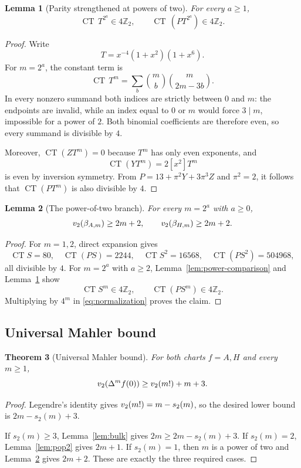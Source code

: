 \documentclass[11pt]{article}
\newtheorem{theorem}{Theorem}
\newtheorem{lemma}[theorem]{Lemma}
\theoremstyle{remark}\newtheorem{remark}[theorem]{Remark}
\newcommand{\CT}{\operatorname{CT}}
\newcommand{\Z}{\mathbb Z}\newcommand{\Q}{\mathbb Q}
\begin{document}
\begin{lemma}[Parity strengthened at powers of two]\label{lem:power-parity}
For every $a\ge1$,
\[
\CT\,T^{2^a}\in4\Z_2,
\qquad
\CT\,(PT^{2^a})\in4\Z_2.
\]
\end{lemma}

\begin{proof}
Write
\[
T=x^{-4}(1+x^2)(1+x^6).
\]
For $m=2^a$, the constant term is
\[
\CT\,T^m=\sum_b\binom mb\binom m{2m-3b}.
\]
In every nonzero summand both indices are strictly between $0$ and $m$:
the endpoints are invalid, while an index equal to $0$ or $m$ would force
$3\mid m$, impossible for a power of $2$.  Both binomial coefficients
are therefore even, so every summand is divisible by $4$.

Moreover, $\CT(ZT^m)=0$ because $T^m$ has only even exponents, and
\[
\CT(YT^m)=2[x^2]T^m
\]
is even by inversion symmetry.  From
$P=13+\pi^2Y+3\pi^3Z$ and $\pi^2=2$, it follows that
$\CT(PT^m)$ is also divisible by $4$.
\end{proof}

\begin{lemma}[The power-of-two branch]\label{lem:powers}
For every $m=2^a$ with $a\ge0$,
\[
v_2(\beta_{A,m})\ge2m+2,
\qquad
v_2(\beta_{H,m})\ge2m+2.
\]
\end{lemma}

\begin{proof}
For $m=1,2$, direct expansion gives
\[
\CT S=80,\quad \CT(PS)=2244,
\quad \CT S^2=16568,\quad \CT(PS^2)=504968,
\]
all divisible by $4$.  For $m=2^a$ with $a\ge2$,
Lemma~\ref{lem:power-comparison} and Lemma~\ref{lem:power-parity} show
\[
\CT S^m\in4\Z_2,
\qquad
\CT(PS^m)\in4\Z_2.
\]
Multiplying by $4^m$ in \eqref{eq:normalization} proves the claim.
\end{proof}

\subsection{Universal Mahler bound}

\begin{theorem}[Universal Mahler bound]\label{thm:mahler}
For both charts $f=A,H$ and every $m\ge1$,
\[
v_2(\Delta^m f(0))\ge v_2(m!)+m+3.
\]
\end{theorem}

\begin{proof}
Legendre's identity gives $v_2(m!)=m-s_2(m)$, so the desired lower
bound is $2m-s_2(m)+3$.

If $s_2(m)\ge3$, Lemma~\ref{lem:bulk} gives $2m\ge2m-s_2(m)+3$.
If $s_2(m)=2$, Lemma~\ref{lem:pop2} gives $2m+1$.
If $s_2(m)=1$, then $m$ is a power of two and Lemma~\ref{lem:powers}
gives $2m+2$.  These are exactly the three required cases.
\end{proof}
\end{document}
